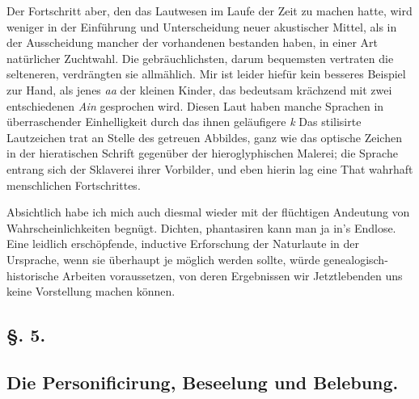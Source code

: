 \label{fp.305}

Der Fortschritt aber, den das Lautwesen im Laufe der Zeit zu machen hatte, wird weniger in der Einführung und Unterscheidung neuer akustischer Mittel, als in der Ausscheidung mancher der vorhandenen bestanden haben, in einer Art natürlicher Zuchtwahl. Die gebräuchlichsten, darum bequemsten vertraten die selteneren, verdrängten sie allmählich. Mir ist leider hiefür kein besseres Beispiel zur Hand, als jenes {\ain}\textit{a}{\ain}\textit{a} der kleinen Kinder, das bedeutsam krächzend mit zwei entschiedenen {\ain}\textit{Ain} gesprochen wird. Diesen Laut haben manche Sprachen in überraschender Einhelligkeit durch das ihnen geläufigere \textit{k}   Das stilisirte Lautzeichen trat an Stelle des getreuen Abbildes, ganz wie das optische Zeichen in der hieratischen Schrift gegenüber der hieroglyphischen Malerei; die Sprache entrang sich der Sklaverei ihrer Vorbilder, und eben hierin lag eine That wahrhaft menschlichen Fortschrittes. 

\label{sp.315}

Absichtlich habe ich mich auch diesmal wieder mit der flüchtigen Andeutung von Wahrscheinlichkeiten begnügt. Dichten, phantasiren kann man ja in’s Endlose. Eine leidlich erschöpfende, inductive Erforschung der Naturlaute in der Ursprache, wenn sie überhaupt je möglich werden sollte, würde genealogisch-historische Arbeiten voraussetzen, von deren Ergebnissen wir Jetztlebenden uns keine Vorstellung machen können.

\subsection*{§. 5.}\label{IV.II.5}
\subsection*{Die Personificirung, Beseelung und Belebung.}

